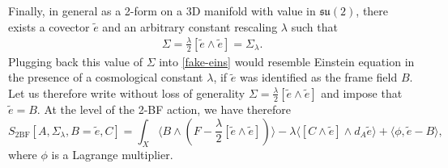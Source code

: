 \documentclass[onecolumn]{article}
\theoremstyle{theorem}
\theoremstyle{remark}
\theoremstyle{example}
\theoremstyle{definition}
\numberwithin{equation}{section}
\newcommand{\beq}{\begin{eqnarray}}
\newcommand{\eeq}{\end{eqnarray}}
\begin{document}
Finally, in general as a 2-form on a 3D manifold with value in $\mathfrak{su}(2)$, there exists a covector $\tilde e$ and an arbitrary constant rescaling $\lambda$ such that  
\beq \label{cosmo}
\Sigma=\frac\lambda2 [\tilde e\wedge \tilde e]=\Sigma_\lambda.   
\eeq
{Plugging} back this value of $\Sigma$ into \eqref{fake-eins} would  resemble Einstein equation in the presence of a cosmological constant $\lambda$, if $\tilde e$ was identified as the frame field $B$. Let us therefore write  without loss of generality $\Sigma=\frac\lambda2 [\tilde e\wedge \tilde e]$ and  impose that $\tilde e =B$. 
At the level of the 2-BF action, we have therefore 
\begin{equation}
    S_\text{2BF}[A,\Sigma_\lambda, B =\tilde e, C] = \int_X \langle B \wedge(F-\frac\lambda2 [\tilde e\wedge \tilde e])\rangle - \lambda\langle [C\wedge \tilde e]\wedge  d_A\tilde e \rangle + \langle \phi, \tilde e - B\rangle ,\label{3d2bf-lambda3}
\end{equation}
where $\phi$ is a Lagrange multiplier. 
\end{document}
